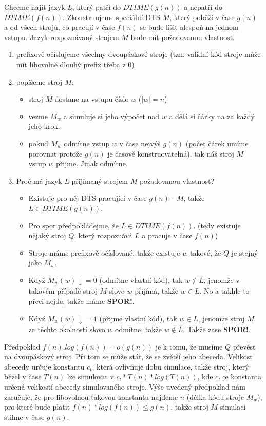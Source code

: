 \documentclass[a4paper]{article}      %
\newenvironment{proof}[1][Důkaz]{\begin{trivlist}
\item[\hskip \labelsep {\bfseries #1}]}{\end{trivlist}}
\begin{document}
\begin{proof}
Chceme najít jazyk $L$, který patří do $DTIME(g(n))$ a nepatří do $DTIME(f(n))$.
Zkonstruujeme speciální DTS $M$, který poběží v čase $g(n)$ a od všech strojů,
co pracují v čase $f(n)$ se bude lišit alespoň na jednom vstupu. Jazyk rozpoznávaný strojem $M$ bude mít požadovanou vlastnost.
\begin{enumerate}
\item prefixově očíslujeme všechny dvoupáskové stroje (tzn. validní kód stroje může mít libovolně dlouhý prefix třeba z 0)
\item popíšeme stroj $M$:
	\begin{itemize}
		\item stroj $M$ dostane na vstupu číslo $w$ ($|w|=n$)
		\item vezme $M_{w}$ a simuluje si jeho výpočet nad $w$ a dělá si čárky na za každý jeho krok.
		\item pokud $M_{w}$ odmítne vstup $w$ v čase nejvýš $g(n)$
		(počet čárek umíme porovnat protože $g(n)$ je časově konstruovatelná), tak náš stroj $M$ vstup $w$ přijme. Jinak odmítne.
	\end{itemize}
\item Proč má jazyk $L$ přijímaný strojem $M$ požadovanou vlastnost?
	\begin{itemize}
		\item Existuje pro něj DTS pracující v čase $g(n)$ - $M$, takže $L \in DTIME(g(n))$.
		\item Pro spor předpokládejme, že $L \in DTIME(f(n))$.
		(tedy existuje nějaký stroj $Q$, který rozpoznává $L$ a pracuje v čase $f(n)$)
		\item Stroje máme prefixově očíslované, takže existuje $w$ takové, že $Q$ je stejný jako $M_{w}$.
		\item Když $M_{w}(w)\downarrow = 0$ (odmítne vlastní kód), tak $w \notin L$, jenomže v takovém případě stroj $M$ slovo $w$ přijímá, takže $w \in L$. No a takhle to přeci nejde, takže máme \textbf{SPOR!}. 
		\item Když $M_{w}(w)\downarrow = 1$ (přijme vlastní kód), tak $w \in L$, jenomže stroj $M$ za těchto okolností slovo $w$ odmítne, takže $w \notin L$. Takže zase \textbf{SPOR!}.  
	\end{itemize}
\end{enumerate}
Předpoklad $f(n).log(f(n)) = o(g(n))$ je k tomu, že musíme $Q$ převést na dvoupáskový stroj. Při tom se může stát, že se zvětší jeho abeceda.
Velikost abecedy určuje konstantu $c_t$, která ovlivňuje dobu simulace, takže stroj, který běžel v čase $T(n)$ lze simulovat v $c_{t}*T(n)*log(T(n))$, kde $c_t$ je konstanta určená velikostí abecedy simulovaného stroje.
Výše uvedený předpoklad nám zaručuje, že pro libovolnou takovou konstantu najdeme $n$ (délka kódu stroje $M_{w}$),
pro které bude platit $f(n)*log(f(n)) \leq g(n)$, takže stroj $M$ simulaci stihne v čase $g(n)$. 
\end{proof}
\end{document}
